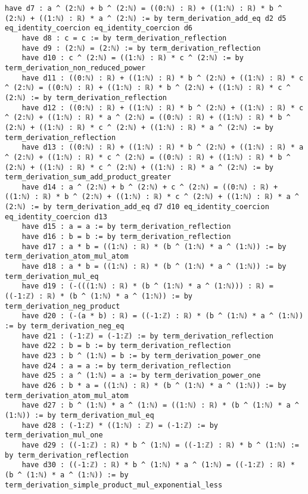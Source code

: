\documentclass{article}
\begin{document}
\begin{tcolorbox}[colback=white!10, width=\linewidth]
\begin{lstlisting}[language=Lean4]
    have d7 : a ^ (2:ℕ) + b ^ (2:ℕ) = ((0:ℕ) : ℝ) + ((1:ℕ) : ℝ) * b ^ (2:ℕ) + ((1:ℕ) : ℝ) * a ^ (2:ℕ) := by term_derivation_add_eq d2 d5 eq_identity_coercion eq_identity_coercion d6
    have d8 : c = c := by term_derivation_reflection
    have d9 : (2:ℕ) = (2:ℕ) := by term_derivation_reflection
    have d10 : c ^ (2:ℕ) = ((1:ℕ) : ℝ) * c ^ (2:ℕ) := by term_derivation_non_reduced_power
    have d11 : ((0:ℕ) : ℝ) + ((1:ℕ) : ℝ) * b ^ (2:ℕ) + ((1:ℕ) : ℝ) * c ^ (2:ℕ) = ((0:ℕ) : ℝ) + ((1:ℕ) : ℝ) * b ^ (2:ℕ) + ((1:ℕ) : ℝ) * c ^ (2:ℕ) := by term_derivation_reflection
    have d12 : ((0:ℕ) : ℝ) + ((1:ℕ) : ℝ) * b ^ (2:ℕ) + ((1:ℕ) : ℝ) * c ^ (2:ℕ) + ((1:ℕ) : ℝ) * a ^ (2:ℕ) = ((0:ℕ) : ℝ) + ((1:ℕ) : ℝ) * b ^ (2:ℕ) + ((1:ℕ) : ℝ) * c ^ (2:ℕ) + ((1:ℕ) : ℝ) * a ^ (2:ℕ) := by term_derivation_reflection
    have d13 : ((0:ℕ) : ℝ) + ((1:ℕ) : ℝ) * b ^ (2:ℕ) + ((1:ℕ) : ℝ) * a ^ (2:ℕ) + ((1:ℕ) : ℝ) * c ^ (2:ℕ) = ((0:ℕ) : ℝ) + ((1:ℕ) : ℝ) * b ^ (2:ℕ) + ((1:ℕ) : ℝ) * c ^ (2:ℕ) + ((1:ℕ) : ℝ) * a ^ (2:ℕ) := by term_derivation_sum_add_product_greater
    have d14 : a ^ (2:ℕ) + b ^ (2:ℕ) + c ^ (2:ℕ) = ((0:ℕ) : ℝ) + ((1:ℕ) : ℝ) * b ^ (2:ℕ) + ((1:ℕ) : ℝ) * c ^ (2:ℕ) + ((1:ℕ) : ℝ) * a ^ (2:ℕ) := by term_derivation_add_eq d7 d10 eq_identity_coercion eq_identity_coercion d13
    have d15 : a = a := by term_derivation_reflection
    have d16 : b = b := by term_derivation_reflection
    have d17 : a * b = ((1:ℕ) : ℝ) * (b ^ (1:ℕ) * a ^ (1:ℕ)) := by term_derivation_atom_mul_atom
    have d18 : a * b = ((1:ℕ) : ℝ) * (b ^ (1:ℕ) * a ^ (1:ℕ)) := by term_derivation_mul_eq
    have d19 : (-(((1:ℕ) : ℝ) * (b ^ (1:ℕ) * a ^ (1:ℕ))) : ℝ) = ((-1:ℤ) : ℝ) * (b ^ (1:ℕ) * a ^ (1:ℕ)) := by term_derivation_neg_product
    have d20 : (-(a * b) : ℝ) = ((-1:ℤ) : ℝ) * (b ^ (1:ℕ) * a ^ (1:ℕ)) := by term_derivation_neg_eq
    have d21 : (-1:ℤ) = (-1:ℤ) := by term_derivation_reflection
    have d22 : b = b := by term_derivation_reflection
    have d23 : b ^ (1:ℕ) = b := by term_derivation_power_one
    have d24 : a = a := by term_derivation_reflection
    have d25 : a ^ (1:ℕ) = a := by term_derivation_power_one
    have d26 : b * a = ((1:ℕ) : ℝ) * (b ^ (1:ℕ) * a ^ (1:ℕ)) := by term_derivation_atom_mul_atom
    have d27 : b ^ (1:ℕ) * a ^ (1:ℕ) = ((1:ℕ) : ℝ) * (b ^ (1:ℕ) * a ^ (1:ℕ)) := by term_derivation_mul_eq
    have d28 : (-1:ℤ) * ((1:ℕ) : ℤ) = (-1:ℤ) := by term_derivation_mul_one
    have d29 : ((-1:ℤ) : ℝ) * b ^ (1:ℕ) = ((-1:ℤ) : ℝ) * b ^ (1:ℕ) := by term_derivation_reflection
    have d30 : ((-1:ℤ) : ℝ) * b ^ (1:ℕ) * a ^ (1:ℕ) = ((-1:ℤ) : ℝ) * (b ^ (1:ℕ) * a ^ (1:ℕ)) := by term_derivation_simple_product_mul_exponential_less

\end{lstlisting}
\end{tcolorbox}
\end{document}
